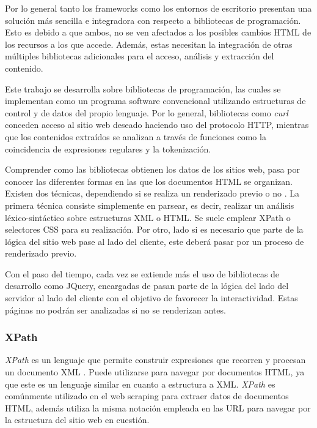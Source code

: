 Por lo general tanto los frameworks como los entornos de escritorio presentan una solución más sencilla
e integradora con respecto a bibliotecas de programación. Esto es debido a que ambos, no se ven afectados
a los posibles cambios HTML de los recursos a los que accede. Además, estas necesitan la integración de
otras múltiples bibliotecas adicionales para el acceso, análisis y extracción del contenido.

Este trabajo se desarrolla sobre bibliotecas de programación, las cuales se implementan como un programa
software convencional utilizando estructuras de control y de datos del propio lenguaje. Por lo general,
bibliotecas como \emph{curl \cite{curl-cran}} conceden acceso al sitio web deseado haciendo uso del
protocolo HTTP, mientras que los contenidos extraídos se analizan a través de funciones como la
coincidencia de expresiones regulares y la tokenización.

Comprender como las bibliotecas obtienen los datos de los sitios web, pasa por conocer las diferentes
formas en las que los documentos HTML se organizan. Existen dos técnicas, dependiendo si se realiza un
renderizado previo o no \cite{tfg-daniel-francisco-lopez}. La primera técnica consiste simplemente en
parsear, es decir, realizar un análisis léxico-sintáctico sobre estructuras XML o HTML. Se suele emplear
XPath o selectores CSS para su realización. Por otro, lado si es necesario que parte de la lógica del
sitio web pase al lado del cliente, este deberá pasar por un proceso de renderizado previo.

Con el paso del tiempo, cada vez se extiende más el uso de bibliotecas de desarrollo como JQuery, encargadas 
de pasan parte de la lógica del lado del servidor al lado del cliente con el objetivo de favorecer la 
interactividad. Estas páginas no podrán ser analizadas si no se renderizan antes.


\subsubsection{XPath}
\label{subsubsec:xpath}

\emph{XPath} es un lenguaje que permite construir expresiones que recorren y procesan un documento XML
\cite{xpath-wikipedia}. Puede utilizarse para navegar por documentos HTML, ya que este es un lenguaje
similar en cuanto a estructura a XML. \emph{XPath} es comúnmente utilizado en el web scraping para extraer
datos de documentos HTML, además utiliza la misma notación empleada en las URL para navegar por la
estructura del sitio web en cuestión.

